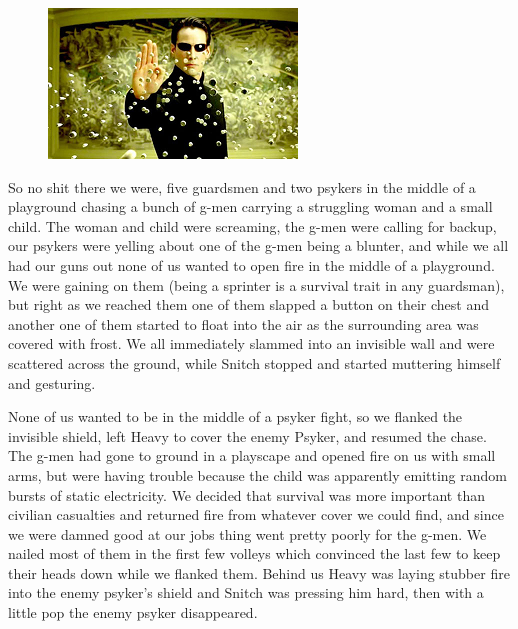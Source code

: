 \begin{figure}
	\begin{center}
		\includegraphics[width=\figwidth]{pics/3/13.png}
	\end{center}
\end{figure}
So no shit there we were, five guardsmen and two psykers in the middle of a playground chasing a bunch of g-men carrying a struggling woman and a small child.
The woman and child were screaming, the g-men were calling for backup, our psykers were yelling about one of the g-men being a blunter, and while we all had our guns out none of us wanted to open fire in the middle of a playground. 
We were gaining on them (being a sprinter is a survival trait in any guardsman), but right as we reached them one of them slapped a button on their chest and another one of them started to float into the air as the surrounding area was covered with frost. 
We all immediately slammed into an invisible wall and were scattered across the ground, while Snitch stopped and started muttering himself and gesturing.

None of us wanted to be in the middle of a psyker fight, so we flanked the invisible shield, left Heavy to cover the enemy Psyker, and resumed the chase. 
The g-men had gone to ground in a playscape and opened fire on us with small arms, but were having trouble because the child was apparently emitting random bursts of static electricity. 
We decided that survival was more important than civilian casualties and returned fire from whatever cover we could find, and since we were damned good at our jobs thing went pretty poorly for the g-men. 
We nailed most of them in the first few volleys which convinced the last few to keep their heads down while we flanked them. 
Behind us Heavy was laying stubber fire into the enemy psyker’s shield and Snitch was pressing him hard, then with a little pop the enemy psyker disappeared.

